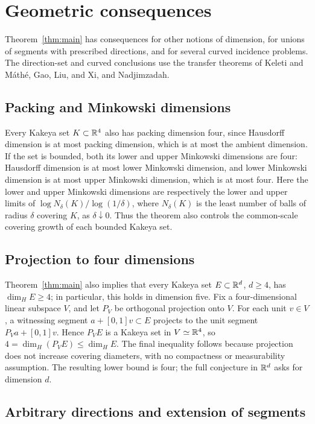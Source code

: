 \section{Geometric consequences}\label{sec:consequences}

Theorem~\ref{thm:main} has consequences for other notions of dimension,
for unions of segments with prescribed directions, and for several
curved incidence problems. The direction-set and curved conclusions
use the transfer theorems of Keleti and M\'ath\'e, Gao, Liu, and Xi,
and Nadjimzadah.

\subsection{Packing and Minkowski dimensions}

Every Kakeya set \(K\subset\mathbb R^4\) also has packing dimension four, since
Hausdorff dimension is at most packing dimension, which is at most
the ambient dimension. If the set is bounded, both its lower and
upper Minkowski dimensions are four: Hausdorff dimension is at most
lower Minkowski dimension, and lower Minkowski dimension is at most
upper Minkowski dimension, which is at most four. Here the lower and
upper Minkowski dimensions are respectively the lower and upper
limits of \(\log N_\delta(K)/\log(1/\delta)\), where
\(N_\delta(K)\) is the least number of balls of radius \(\delta\)
covering \(K\), as \(\delta\downarrow0\). Thus the theorem also
controls the common-scale covering growth of each bounded Kakeya set.

\subsection{Projection to four dimensions}

Theorem~\ref{thm:main} also implies that every Kakeya set
\(E\subset\mathbb R^d\), \(d\ge4\), has \(\dim_H E\ge4\); in particular,
this holds in dimension five. Fix a four-dimensional linear subspace
\(V\), and let \(P_V\) be orthogonal projection onto \(V\). For each
unit \(v\in V\), a witnessing segment \(a+[0,1]v\subset E\) projects
to the unit segment \(P_Va+[0,1]v\). Hence \(P_VE\) is a Kakeya set
in \(V\simeq\mathbb R^4\), so \(4=\dim_H(P_VE)\le\dim_H E\). The final
inequality follows because projection does not increase covering
diameters, with no compactness or measurability assumption.
The resulting lower bound is four; the full conjecture in
\(\mathbb R^d\) asks for dimension \(d\).

\subsection{Arbitrary directions and extension of segments}

